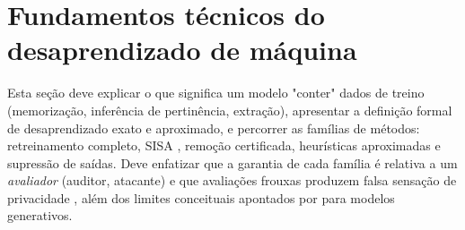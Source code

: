 \section{Fundamentos técnicos do desaprendizado de máquina}


Esta seção deve explicar o que significa um modelo "conter" dados de treino
(memorização, inferência de pertinência, extração), apresentar a definição
formal de desaprendizado exato e aproximado, e percorrer as famílias de
métodos: retreinamento completo, SISA \parencite{bourtoule2021machine},
remoção certificada, heurísticas aproximadas e supressão de saídas. Deve
enfatizar que a garantia de cada família é relativa a um \emph{avaliador}
(auditor, atacante) e que avaliações frouxas produzem falsa sensação de
privacidade \parencite{hayes2024inexact}, além dos limites conceituais
apontados por \textcite{cooper2024unlearning} para modelos generativos.

